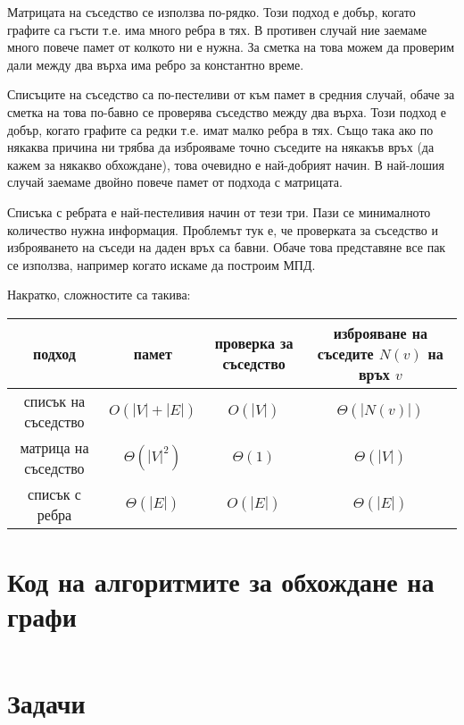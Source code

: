 \documentclass{article}
\theoremstyle{definition}
\theoremstyle{plain}
\theoremstyle{remark}
\theoremstyle{definition}
\begin{document}
Матрицата на съседство се използва по-рядко.
Този подход е добър, когато графите са гъсти т.е. има много ребра в тях.
В противен случай ние заемаме много повече памет от колкото ни е нужна.
За сметка на това можем да проверим дали между два върха има ребро за константно време.

Списъците на съседство са по-пестеливи от към памет в средния случай, обаче за сметка на това по-бавно се проверява съседство между два върха.
Този подход е добър, когато графите са редки т.е. имат малко ребра в тях.
Също така ако по някаква причина ни трябва да изброяваме точно съседите на някакъв връх (да кажем за някакво обхождане), това очевидно е най-добрият начин.
В най-лошия случай заемаме двойно повече памет от подхода с матрицата.

Списъка с ребрата е най-пестеливия начин от тези три.
Пази се минималното количество нужна информация.
Проблемът тук е, че проверката за съседство и изброяването на съседи на даден връх са бавни.
Обаче това представяне все пак се използва, например когато искаме да построим МПД.

Накратко, сложностите са такива:
\begin{center}
  \begin{tabular}{|c|c|c|c|}
    \hline
    подход               & памет           & проверка за съседство & изброяване на съседите $N(v)$ на връх $v$ \\
    \hline
    списък на съседство  & $O(|V| + |E|)$  & $O(|V|)$              & $\Theta(|N(v)|)$                          \\
    \hline
    матрица на съседство & $\Theta(|V|^2)$ & $\Theta(1)$           & $\Theta(|V|)$                             \\
    \hline
    списък с ребра       & $\Theta(|E|)$   & $O(|E|)$              & $\Theta(|E|)$                             \\
    \hline
  \end{tabular}
\end{center}

\section*{Код на алгоритмите за обхождане на графи}

\inputminted[linenos]{c++}{algorithms/traversal.cpp}

\section*{Задачи}
\end{document}
